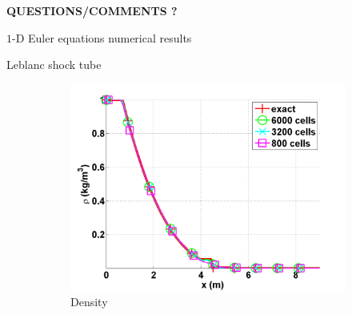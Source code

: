 \documentclass[xcolor=dvipsnames,10pt]{beamer}
\begin{document}
\begin{frame}{}
\begin{center}
\LARGE{\textbf{QUESTIONS/COMMENTS ?}}
\end{center}
\end{frame}
\begin{frame}{}
\begin{center}
$1$-D Euler equations numerical results
\end{center}
\end{frame}
\begin{frame}{Leblanc shock tube}
\begin{figure}[H]
        \centering
        \begin{subfigure}[b]{0.37\textwidth}
                \centering
                \includegraphics[width=\textwidth]{../figures/Leblanc_exact_and_numerical_stt_density_6000.png}
                \caption{Density}
                \label{fig:1d_leblanc_vel}
        \end{subfigure}%
        \begin{subfigure}[b]{0.37\textwidth}
                \centering

\end{subfigure}
\end{figure}
\end{frame}
\end{document}
